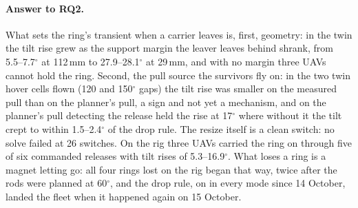 \paragraph{Answer to RQ2.} What sets the ring's transient when a carrier leaves is, first, geometry: in the twin the tilt
rise grew as the support margin the leaver leaves behind shrank, from 5.5--7.7$^\circ$ at 112\,mm to
27.9--28.1$^\circ$ at 29\,mm, and with no margin three UAVs cannot hold the ring. Second, the pull source the survivors
fly on: in the two twin hover cells flown (120 and 150$^\circ$ gaps) the tilt rise was smaller on the measured pull than
on the planner's pull, a sign and not yet a mechanism, and on the planner's pull detecting the release held the rise at
17$^\circ$ where without it the tilt crept to within 1.5--2.4$^\circ$ of the drop rule.
The resize itself is a clean switch: no solve failed at 26 switches. On the rig three UAVs carried the ring on through
five of six commanded releases with tilt rises of 5.3--16.9$^\circ$. What loses a ring is a magnet letting go: all four
rings lost on the rig began that way, twice after the rods were planned at 60$^\circ$, and the drop rule, on in every
mode since 14 October, landed the fleet when it happened again on 15 October.
